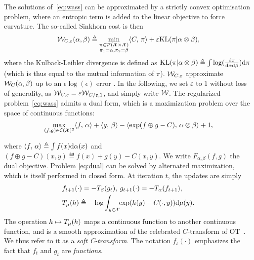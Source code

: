 The solutions of~\eqref{eq:wass} can be approximated by a strictly convex optimisation problem, where an entropic term is added to the linear objective to force curvature. The so-called Sinkhorn cost is then
\begin{equation}\label{eq:wass}
    \mathcal{W}_{C,\varepsilon}(\alpha, \beta) \triangleq 
    \min_{
    \substack{
        \pi \in \mathcal{P}(\mathcal{X} \times \mathcal{X})
        \\\pi_1 = \alpha, \pi_2 = \beta
    }    
    } \langle C,\,\pi\rangle + \varepsilon \textrm{KL}(\pi | \alpha \otimes \beta),
\end{equation}
where the Kulback-Leibler divergence is defined as $\textrm{KL}(\pi | \alpha \otimes
\beta) \triangleq \int \log(\frac{\textrm{d}\pi}{\textrm{d}\alpha\textrm{d}\beta}) \textrm{d}\pi$ (which is thus equal to
the mutual information of $\pi$).
%
$\mathcal{W}_{C,\varepsilon}$ approximate $\mathcal{W}_C(\alpha,\beta)$ up to an $\epsilon
\log(\epsilon)$ error \citep{2019-Genevay-aistats}. In the following, we set
$\varepsilon$ to $1$ without loss of generality, as $\mathcal{W}_{C, \varepsilon} =
\varepsilon \mathcal{W}_{C / \varepsilon, 1}$, and simply write $\mathcal{W}$.
%
The regularized problem~\eqref{eq:wass} admits a dual form, which is a maximization problem over the space of continuous functions:
\begin{equation}\label{eq:dual}
    \max_{(f, g) \in \mathcal{C}(\mathcal{X})^2} \langle f,\,\alpha\rangle + 
    \langle g,\,\beta\rangle
    - \langle \exp(f \oplus g - C),\,\alpha \otimes \beta\rangle + 1, 
\end{equation}

where $\langle f,\,\alpha\rangle \triangleq \int f(x) \textrm{d}\alpha(x)$ and $(f \oplus g - C)(x,y)
\eqdef f(x)+g(y)-C(x,y)$. We write $F_{\alpha, \beta}(f, g)$ the dual objective. 
Problem \eqref{eq:dual} can be solved by alternated maximization, which is itself performed in closed form. At iteration $t$, the updates are simply
\begin{align}
    &f_{t+1}(\cdot) = - T_{\beta}(g_t), \:
    g_{t+1}(\cdot) = - T_{\alpha}(f_{t+1}), \\
    &
    T_{\mu}(h) \triangleq 
    - \log \int_{y \in \mathcal{X}}\!\! \exp(h(y) - C(\cdot, y))\textrm{d} \mu(y).\label{eq:sinkhorn}
\end{align}
The operation $h \mapsto T_{\mu}(h)$  maps a continuous function to another continuous function, and is a smooth approximation of the celebrated $C$-transform of OT~\cite{santambrogio2015optimal}. We thus refer to it as a \textit{soft C-transform}. 
%
The notation $f_t(\cdot)$ emphasizes the fact that $f_t$ and $g_t$ are
\textit{functions}. 
%

